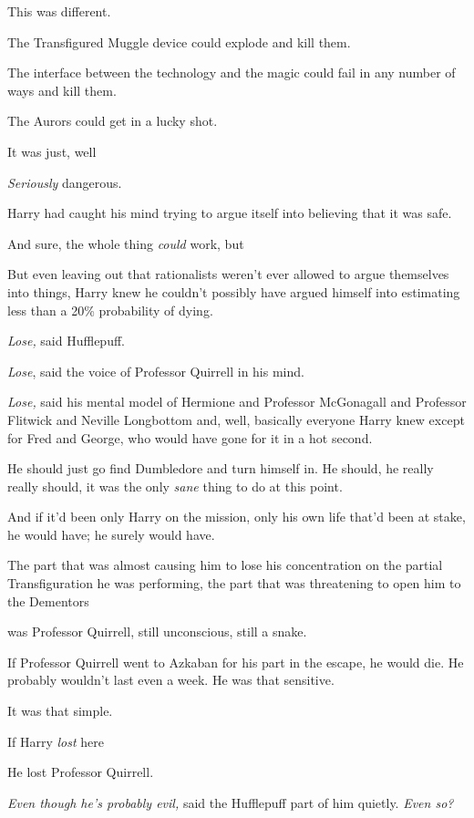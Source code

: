 This was different.

The Transfigured Muggle device could explode and kill them.

The interface between the technology and the magic could fail in any number of
ways and kill them.

The Aurors could get in a lucky shot.

It was just, well{\el}

\emph{Seriously} dangerous.

Harry had caught his mind trying to argue itself into believing that it was
safe.

And sure, the whole thing \emph{could} work, but{\el}

But even leaving out that rationalists weren't ever allowed to argue themselves
into things, Harry knew he couldn't possibly have argued himself into
estimating less than a 20\% probability of dying.

\emph{Lose,} said Hufflepuff.

\emph{Lose}, said the voice of Professor Quirrell in his mind.

\emph{Lose,} said his mental model of Hermione and Professor McGonagall and
Professor Flitwick and Neville Longbottom and, well, basically everyone Harry
knew except for Fred and George, who would have gone for it in a hot second.

He should just go find Dumbledore and turn himself in. He should, he really
really should, it was the only \emph{sane} thing to do at this point.

And if it'd been only Harry on the mission, only his own life that'd been at
stake, he would have; he surely would have.

The part that was almost causing him to lose his concentration on the partial
Transfiguration he was performing, the part that was threatening to open him to
the Dementors{\el}

{\el} was Professor Quirrell, still unconscious, still a snake.

If Professor Quirrell went to Azkaban for his part in the escape, he would die.
He probably wouldn't last even a week. He was that sensitive.

It was that simple.

If Harry \emph{lost} here{\el}

He lost Professor Quirrell.

\emph{Even though he's probably evil,} said the Hufflepuff part of him quietly.
\emph{Even so?}

